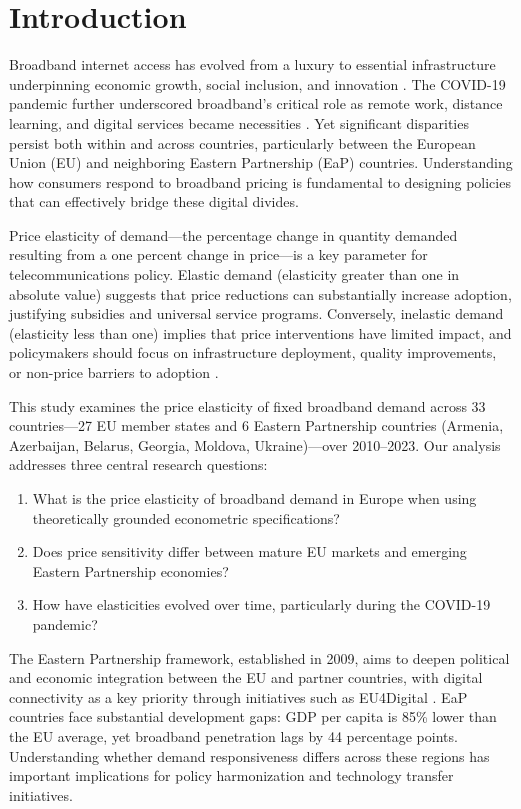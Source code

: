 \documentclass[12pt,review]{elsarticle}
\begin{document}
\section{Introduction}
\label{sec:intro}

Broadband internet access has evolved from a luxury to essential infrastructure underpinning economic growth, social inclusion, and innovation \citep{czernich2011broadband, koutroumpis2009impact}. The COVID-19 pandemic further underscored broadband's critical role as remote work, distance learning, and digital services became necessities \citep{lai2020digital}. Yet significant disparities persist both within and across countries, particularly between the European Union (EU) and neighboring Eastern Partnership (EaP) countries. Understanding how consumers respond to broadband pricing is fundamental to designing policies that can effectively bridge these digital divides.

Price elasticity of demand---the percentage change in quantity demanded resulting from a one percent change in price---is a key parameter for telecommunications policy. Elastic demand (elasticity greater than one in absolute value) suggests that price reductions can substantially increase adoption, justifying subsidies and universal service programs. Conversely, inelastic demand (elasticity less than one) implies that price interventions have limited impact, and policymakers should focus on infrastructure deployment, quality improvements, or non-price barriers to adoption \citep{varian2014microeconomic}.

This study examines the price elasticity of fixed broadband demand across 33 countries---27 EU member states and 6 Eastern Partnership countries (Armenia, Azerbaijan, Belarus, Georgia, Moldova, Ukraine)---over 2010--2023. Our analysis addresses three central research questions:

\begin{enumerate}
\item What is the price elasticity of broadband demand in Europe when using theoretically grounded econometric specifications?
\item Does price sensitivity differ between mature EU markets and emerging Eastern Partnership economies?
\item How have elasticities evolved over time, particularly during the COVID-19 pandemic?
\end{enumerate}

The Eastern Partnership framework, established in 2009, aims to deepen political and economic integration between the EU and partner countries, with digital connectivity as a key priority through initiatives such as EU4Digital \citep{ec2021eastern}. EaP countries face substantial development gaps: GDP per capita is 85\% lower than the EU average, yet broadband penetration lags by 44 percentage points. Understanding whether demand responsiveness differs across these regions has important implications for policy harmonization and technology transfer initiatives.
\end{document}
